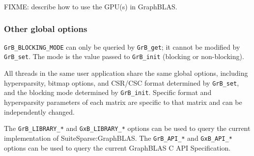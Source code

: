 FIXME: describe how to use the GPU(s) in GraphBLAS.

\subsubsection{Other global options}

\verb'GrB_BLOCKING_MODE' can only be queried by \verb'GrB_get'; it cannot be
modified by \verb'GrB_set'.  The mode is the value passed to \verb'GrB_init'
(blocking or non-blocking).

All threads in the same user application share the same global options,
including hypersparsity, bitmap options, and CSR/CSC format determined by
\verb'GrB_set', and the blocking mode determined by \verb'GrB_init'.
Specific format and hypersparsity parameters of each matrix are specific to
that matrix and can be independently changed.

The \verb'GrB_LIBRARY_*' and \verb'GxB_LIBRARY_*' options can be used to query
the current implementation of SuiteSparse:GraphBLAS.  The \verb'GrB_API_*' and
\verb'GxB_API_*' options can be used to query the current GraphBLAS C API
Specification.

